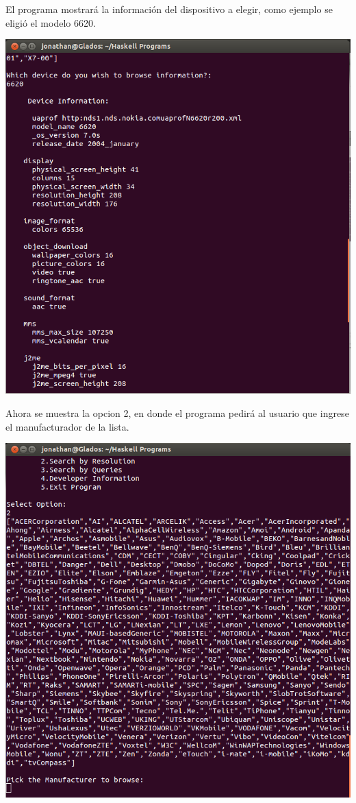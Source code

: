 \documentclass[11pt]{article} %
\begin{document}
El programa mostrará la información del dispositivo a elegir, como ejemplo se eligió el modelo 6620.
\begin{center}
\includegraphics[scale=0.4]{screens/haskell4.png}
\end{center}
Ahora se muestra la opcion 2, en donde el programa pedirá al usuario que ingrese el manufacturador de la lista.
\begin{center}
\includegraphics[scale=0.4]{screens/haskell5.png}
\end{center}
\end{document}
